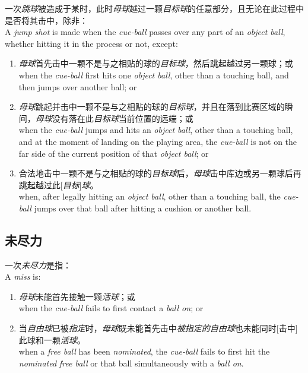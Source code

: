 \noindent 一次\emph{跳球}被造成于某时，此时\emph{母球}越过一颗\emph{目标球}的任意部分，且无论在此过程中是否将其击中，除非：\\
A \emph{jump shot} is made when the \emph{cue-ball} passes over any part of an \emph{object ball}, whether hitting it in the process or not, except:
\begin{enumerate}[label=(\alph*)]
    \item \emph{母球}首先击中一颗不是与之相贴的球的\emph{目标球}，然后跳起越过另一颗球；或\\
    when the \emph{cue-ball} first hits one \emph{object ball}, other than a touching ball, and then jumps over another ball; or
    \item \emph{母球}跳起并击中一颗不是与之相贴的球的\emph{目标球}，并且在落到比赛区域的瞬间，\emph{母球}没有落在此\emph{目标球}当前位置的远端；或\\
    when the \emph{cue-ball} jumps and hits an \emph{object ball}, other than a touching ball, and at the moment of landing on the playing area, the \emph{cue-ball} is not on the far side of the current position of that \emph{object ball}; or
    \item 合法地击中一颗不是与之相贴的球的\emph{目标球}后，\emph{母球}击中库边或另一颗球后再跳起越过此[\emph{目标}]\emph{球}。\\
    when, after legally hitting an \emph{object ball}, other than a touching ball, the \emph{cue-ball} jumps over that ball after hitting a cushion or another ball.
\end{enumerate}

\subsection{未尽力}

\noindent 一次\emph{未尽力}是指：\\
A \emph{miss} is:
\begin{enumerate}[label=(\alph*)]
    \item \emph{母球}未能首先接触一颗\emph{活球}；或\\
    when the \emph{cue-ball} fails to first contact a \emph{ball on}; or
    \item 当\emph{自由球}已被\emph{指定}时，\emph{母球}既未能首先击中\emph{被指定的}\emph{自由球}也未能同时[击中]此球和一颗\emph{活球}。\\
    when a \emph{free ball} has been \emph{nominated}, the \emph{cue-ball} fails to first hit the \emph{nominated} \emph{free ball} or that ball simultaneously with a \emph{ball on}.
\end{enumerate}

